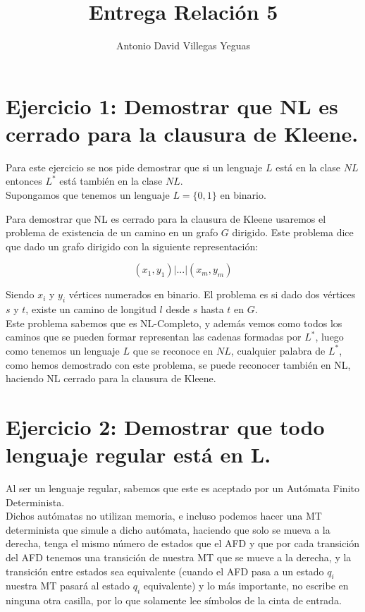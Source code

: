\documentclass{article}
\title{Entrega Relación 5}
\author{Antonio David Villegas Yeguas}
\date{}
\begin{document}
\maketitle


\section*{Ejercicio 1: Demostrar que NL es cerrado para la clausura de Kleene.}

Para este ejercicio se nos pide demostrar que si un lenguaje $L$ está en la clase $NL$ entonces $L^*$ está también en la clase $NL$.\\

Supongamos que tenemos un lenguaje $L = \{0, 1\}$ en binario.

Para demostrar que NL es cerrado para la clausura de Kleene usaremos el problema de existencia de un camino en un grafo $G$ dirigido. Este problema dice que dado un grafo dirigido con la siguiente representación:

$$ (x_1, y_1)|...|(x_m, y_m) $$

Siendo $x_i$ y $y_i$ vértices numerados en binario. El problema es si dado dos vértices $s$ y $t$, existe un camino de longitud $l$ desde $s$ hasta $t$ en $G$. \\


Este problema sabemos que es NL-Completo, y además vemos como todos los caminos que se pueden formar representan las cadenas formadas por $L^*$, luego como tenemos un lenguaje $L$ que se reconoce en $NL$, cualquier palabra de $L^*$, como hemos demostrado con este problema, se puede reconocer también en NL, haciendo NL cerrado para la clausura de Kleene.

\section*{Ejercicio 2: Demostrar que todo lenguaje regular está en L.}

	Al ser un lenguaje regular, sabemos que este es aceptado por un Autómata Finito Determinista. \\

Dichos autómatas no utilizan memoria, e incluso podemos hacer una MT determinista que simule a dicho autómata, haciendo que solo se mueva a la derecha, tenga el mismo número de estados que el AFD y que por cada transición del AFD tenemos una transición de nuestra MT que se mueve a la derecha, y la transición entre estados sea equivalente (cuando el AFD pasa a un estado $q_i$ nuestra MT pasará al estado $q_i$ equivalente) y lo más importante, no escribe en ninguna otra casilla, por lo que solamente lee símbolos de la cinta de entrada.\\
\end{document}

